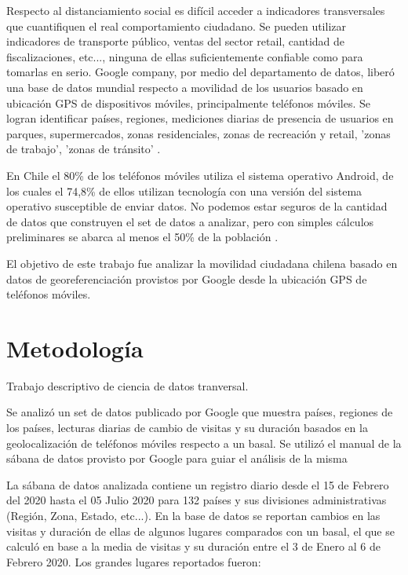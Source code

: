 \documentclass{article}
\newcommand\fechafinal{05 Julio 2020 }
\begin{document}
Respecto al distanciamiento social es difícil acceder a indicadores transversales que cuantifiquen el real comportamiento ciudadano. Se pueden utilizar indicadores de transporte público, ventas del sector retail, cantidad de fiscalizaciones, etc..., ninguna de ellas suficientemente confiable como para tomarlas en serio. Google company, por medio del departamento de datos, liberó una base de datos mundial respecto a movilidad de los usuarios basado en ubicación GPS de dispositivos móviles, principalmente teléfonos móviles. Se logran identificar países, regiones, mediciones diarias de presencia de usuarios en parques, supermercados, zonas residenciales, zonas de recreación y retail, 'zonas de trabajo', 'zonas de tránsito' \cite{google_covid-19_2020,our_world_in_data_google_2020}.

En Chile el 80\% de los teléfonos móviles utiliza el sistema operativo Android, de los cuales el 74,8\% de ellos utilizan tecnología con una versión del sistema operativo susceptible de enviar datos. No podemos estar seguros de la cantidad de datos que construyen el set de datos a analizar, pero con simples cálculos preliminares se abarca al menos el 50\% de la población \cite{statcounter_mobile_nodate, android_developer_panel_nodate, casas_iphone_nodate}.

El objetivo de este trabajo fue analizar la movilidad ciudadana chilena basado en datos de georeferenciación provistos por Google desde la ubicación GPS de teléfonos móviles.


\section{Metodología}
Trabajo descriptivo de ciencia de datos tranversal. 


Se analizó un set de datos publicado por Google  \cite{google_covid-19_2020} que muestra países, regiones de los países, lecturas diarias de cambio de visitas y su duración basados en la geolocalización de teléfonos móviles respecto a un basal. Se utilizó el manual de la sábana de datos provisto por Google para guiar el análisis de la misma \cite{google_mobility_2020}

La sábana de datos analizada contiene un registro diario desde el  15 de Febrero del 2020 hasta el \fechafinal para 132 países y sus divisiones administrativas (Región, Zona, Estado, etc...). En la base de datos se reportan cambios en las visitas y duración de ellas de algunos lugares comparados con un basal, el que se calculó en base a la media de visitas y su duración entre el 3 de Enero al 6 de Febrero 2020. Los grandes lugares reportados fueron:
\end{document}
